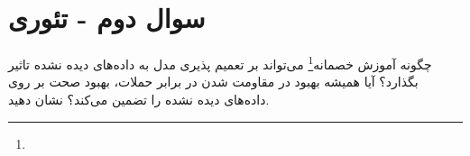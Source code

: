 \section{سوال دوم - تئوری}
چگونه آموزش خصمانه\footnote{} می‌تواند بر تعمیم پذیری مدل به داده‌های دیده نشده تاثیر بگذارد؟ آیا همیشه بهبود در مقاومت شدن در برابر حملات، بهبود صحت بر روی داده‌های دیده نشده را تضمین می‌کند؟ نشان دهید.


\begin{qsolve}

\end{qsolve}